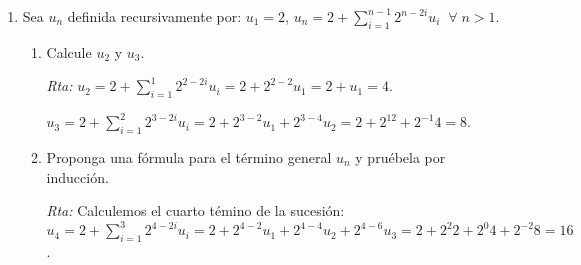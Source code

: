 \documentclass[a4paper,12pt,twoside,spanish,reqno]{amsbook}
\numberwithin{equation}{section}
\newcommand{\rta}{\noindent\textit{Rta: }}
\begin{document}
\begin{enumerate}
        {\it (Paso  inductivo) } Supongamos que $k \ge 1$ y el resultado  es cierto para los $h$ tales que  $1 \le h \le k$. Es decir que $a_h =6^h + (-1)^{h+1}$ para $1 \le h \le k$ y $k \ge 2$ (hipótesis inductiva), entonces debemos probar que $a_{k+1} = 6^{k+1} + (-1)^{k+2}$. Ahora bien, 
        \begin{equation*}
        \begin{matrix}\quad
        a_{k+1} &=&  5a_{k+1-1}+6a_{k+1-2} \hfill &\quad \text{(por definición recursiva)} \hfill \\[4pt]
        &=&  5a_{k}+6a_{k-1}   \hfill &\hfill\\[4pt]
        &=& 5(6^k + (-1)^{k+1})+6(6^{k-1} + (-1)^{k-1+1})  \hfill &\quad \text{(por hipótesis inductiva})\hfill \\[4pt]
        &=& 5(6^k + (-1)^{k+1})+6(6^{k-1} + (-1)^{k})  \hfill  & \hfill\\[4pt]
        &=& 5\cdot 6^k + (-1)^{k+1} 5+6 \cdot 6^{k-1} + (-1)^{k}6  \hfill  & \hfill\\[4pt]
        &=& 5\cdot 6^k + 6^k +(-1)^{k} (-1) 5 + (-1)^{k}6 \hfill  & \hfill\\[4pt]
        &=& (5 + 1)\cdot 6^k +(-1)^{k} ((-1) 5 + 6 )\hfill  & \hfill\\[4pt]
        &=& 6\cdot 6^k +(-1)^{k} \hfill  & \hfill\\[4pt]
        &=& 6^{k+1} +(-1)^{k+2}  \hfill &\quad \text{($(-1)^{k+2} = (-1)^{2}(-1)^{k}=(-1)^{k}$)}\hfill
        \end{matrix}
        \end{equation*}

        \item Sea $u_n$ definida recursivamente por: $u_1=2$, $u_n=2+\sum_{i=1}^{n-1}2^{n-2i}u_i \;\;\forall\; n >1$.
        \begin{enumerate}
            \item Calcule $u_2$ y $u_3$.
            
            \rta $u_2 = 2+\sum_{i=1}^{1}2^{2-2i}u_i = 2+2^{2-2}u_1 = 2 + u_1 = 4$.
            
            $u_3 = 2+\sum_{i=1}^{2}2^{3-2i}u_i = 2+2^{3-2}u_1 + 2^{3-4}u_2=2+2^12 + 2^{-1}4 = 8$.
            
            \item Proponga una fórmula para el término general $u_n$ y pruébela por inducción.
            
            \rta Calculemos el cuarto témino de la sucesión: $u_4 =  2+\sum_{i=1}^{3}2^{4-2i}u_i = 2+2^{4-2}u_1 + 2^{4-4}u_2 + 2^{4-6}u_3= 2+2^2 2 + 2^{0}4 + 2^   {-2}8 = 16$. 
            

\end{enumerate}
\end{enumerate}
\end{document}
